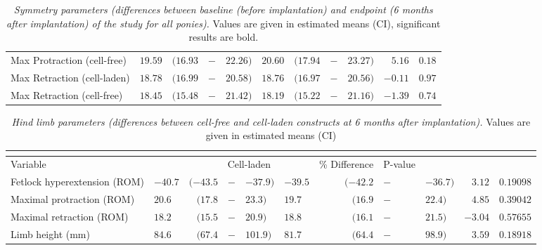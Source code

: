 \documentclass[twocolumn, empirical, authordate, issue]{jote-new-article}
\begin{document}
\begin{table}[ht!]
\begin{tabularx}{\linewidth}{>{\raggedright}p{}>{\raggedleft\arraybackslash}Xrp{}l>{\raggedleft\arraybackslash}Xrp{}lrr}
Max Protraction (cell-free) & $ 19.59$ & $ (16.93$ & $-$ & $22.26)  $& $ 20.60$ & $ (17.94$ & $-$ & $23.27)  $& $  5.16 $& $  0.18  $\tabularnewline 
Max Retraction (cell-laden) & $ 18.78$ & $ (16.99$ & $-$ & $20.58)  $& $ 18.76$ & $ (16.97$ & $-$ & $20.56)  $& $  -0.11 $& $  0.97  $\tabularnewline 
Max Retraction (cell-free) & $ 18.45$ & $ (15.48$ & $-$ & $21.42)  $& $ 18.19$ & $ (15.22$ & $-$ & $21.16)  $& $  -1.39 $& $  0.74  $\tabularnewline 
\bottomrule
\end{tabularx}
\caption{\emph{Symmetry parameters (differences between baseline (before implantation) and endpoint (6 months after implantation) of the study for all ponies).} Values are given in estimated means (CI), significant results are bold.}
\label{tab:table1}
\end{table}

\begin{table}[hb!]
\begin{tabularx}{\textwidth}{p{}>{\raggedleft\arraybackslash}Xrp{}l>{\raggedleft\arraybackslash}Xrp{}lrr}
  \multicolumn{11}{c}{\cellcolor[HTML]{ffffff}}\\[-2ex]
\toprule Variable & \multicolumn{4}{c}{Cell-free} & \multicolumn{4}{c}{Cell-laden} & \% Difference & P-value\tabularnewline \midrule  
Fetlock hyperextension (ROM) & $  -40.7$ & $ (-43.5$ & $-$ & $-37.9)  $& $  -39.5$ & $ (-42.2$ & $-$ & $-36.7)  $& $  3.12  $& $  0.19098 $\tabularnewline 
Maximal protraction (ROM) & $ 20.6$ & $ (17.8$ & $-$ & $23.3)  $& $ 19.7$ & $ (16.9$ & $-$ & $22.4)  $& $  4.85  $& $  0.39042 $\tabularnewline
Maximal retraction (ROM) & $ 18.2$& $ (15.5$ & $-$ & $20.9)  $& $ 18.8$ & $ (16.1$ & $-$ & $21.5)  $& $  -3.04  $& $  0.57655 $\tabularnewline
Limb height (mm) & $ 84.6$ & $ (67.4$ & $-$ & $101.9)  $& $ 81.7$ & $ (64.4$ & $-$ & $98.9)  $& $  3.59  $& $  0.18918 $\tabularnewline
\bottomrule \end{tabularx}
\caption{\emph{Hind limb parameters (differences between cell-free and cell-laden constructs at 6 months after implantation).
} Values are given in estimated means (CI)}
\label{tab:table2}
\end{table}
\end{document}
